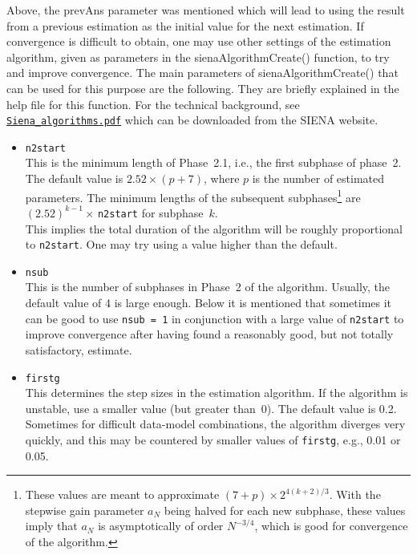 \documentclass[a4paper,fleqn,11pt]{article}
\newcommand{\+}{\, + \,}
\newcommand{\sfn}[1]{\textsf{#1}}
\newcommand{\SI}{{\sf SIENA }}
\begin{document}
Above, the \sfn{prevAns} parameter was mentioned which will
lead to using the result from a previous estimation as the initial
value for the next estimation.
If convergence is difficult to obtain, one may use other
settings of the estimation algorithm, given as
parameters in the \sfn{sienaAlgorithmCreate()} function, to try and
improve convergence.
The main parameters of \sfn{sienaAlgorithmCreate()} that can be used
for this purpose are the following.
They are briefly explained in the help file for this function.
For the technical background, see
\href{http://www.stats.ox.ac.uk/~snijders/siena/Siena_algorithms.pdf}{\texttt{Siena\_algorithms.pdf}}
which can be downloaded from the \SI website.

\begin{itemize}
\item \texttt{n2start}\\
    This is the minimum length of Phase~2.1, i.e., the first subphase of phase~2.
    The default value
     is $2.52\times (p+7)$, where $p$ is the number of estimated parameters.
    The minimum lengths of the subsequent subphases\footnote{These values are
     meant to approximate $(7+p)\times 2^{4(k+2)/3}$.
    With the stepwise gain parameter $a_N$ being halved
    for each new subphase, these values
    imply that $a_N$ is asymptotically of order $N^{-3/4}$, which is
    good for convergence of the algorithm.}
    are $(2.52)^{k-1} \times\,$\texttt{n2start} for subphase~$k$.\\
    This implies the total duration of the algorithm will be roughly proportional to
    \texttt{n2start}. One may try using a value higher than the default.
\item \texttt{nsub}\\
    This is the number of subphases in Phase~2 of the algorithm.
    Usually, the default value of 4 is large enough. Below it is mentioned
    that sometimes it can be good to use \texttt{nsub~=~1} in conjunction
    with a large value of \texttt{n2start} to improve convergence
    after having found a reasonably good, but not totally satisfactory,
    estimate.
\item \texttt{firstg}\\
    This determines the step sizes in the estimation algorithm. If the algorithm is unstable,
    use a smaller value (but greater than~0).
    The default value is 0.2.
    Sometimes for difficult data-model combinations, the algorithm
    diverges very quickly, and this may be countered by smaller values of
     \texttt{firstg}, e.g., 0.01 or 0.05.

\end{itemize}
\end{document}
